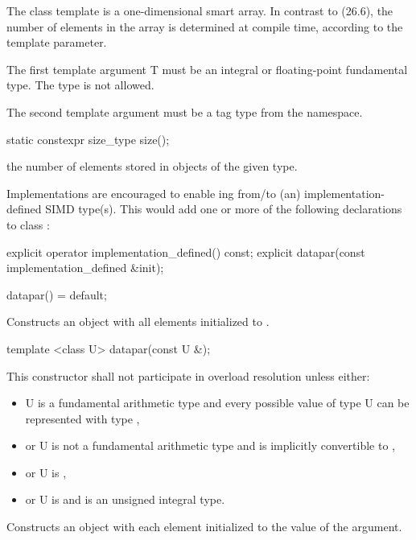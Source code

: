 

\pnum The class template \datapar{} is a one-dimensional smart array.
In contrast to  (26.6), the number of elements in the array is determined at compile time, according to the  template parameter.

\pnum The first template argument \type T must be an integral or floating-point fundamental type.
The type \bool is not allowed.

\pnum The second template argument  must be a tag type from the  namespace.

\begin{itemdecl}
static constexpr size_type size();
\end{itemdecl}
\begin{itemdescr}
  \pnum\returns the number of elements stored in objects of the given \datapar[<T, Abi>] type.
\end{itemdescr}

\pnum\realnote Implementations are encouraged to enable ing from/to (an) implementation-defined SIMD type(s).
This would add one or more of the following declarations to class \datapar:
\begin{itemdecl}
explicit operator implementation_defined() const;
explicit datapar(const implementation_defined &init);
\end{itemdecl}

\begin{itemdecl}
datapar() = default;
\end{itemdecl}
\begin{itemdescr}
  \pnum
  \effects
  Constructs an object with all elements initialized to .
\end{itemdescr}

\begin{itemdecl}
template <class U> datapar(const U &);
\end{itemdecl}
\begin{itemdescr}
  \pnum\remarks This constructor shall not participate in overload resolution unless either:
  \begin{itemize}
    \item \type U is a fundamental arithmetic type and every possible value of type \type U can be represented with type ,
    \item or \type U is not a fundamental arithmetic type and is implicitly convertible to ,
    \item or \type U is \intt,
    \item or \type U is \uint and  is an unsigned integral type.
  \end{itemize}
  \pnum\effects Constructs an object with each element initialized to the value of the argument.
\end{itemdescr}


